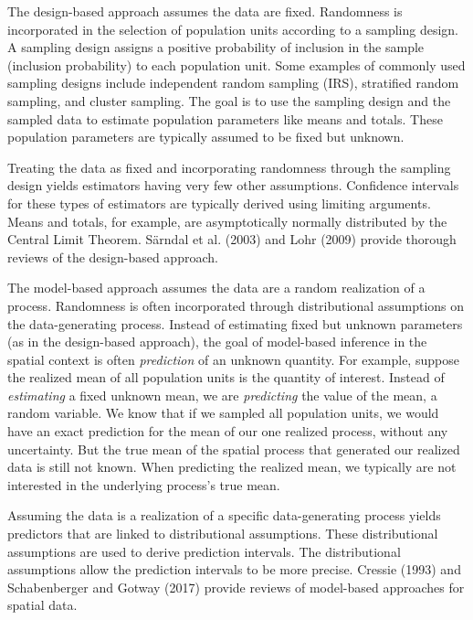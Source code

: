 \documentclass[]{elsarticle} %
\begin{document}
The design-based approach assumes the data are fixed. Randomness is
incorporated in the selection of population units according to a
sampling design. A sampling design assigns a positive probability of
inclusion in the sample (inclusion probability) to each population unit.
Some examples of commonly used sampling designs include independent
random sampling (IRS), stratified random sampling, and cluster sampling.
The goal is to use the sampling design and the sampled data to estimate
population parameters like means and totals. These population parameters
are typically assumed to be fixed but unknown.

Treating the data as fixed and incorporating randomness through the
sampling design yields estimators having very few other assumptions.
Confidence intervals for these types of estimators are typically derived
using limiting arguments. Means and totals, for example, are
asymptotically normally distributed by the Central Limit Theorem.
Särndal et al. (2003) and Lohr (2009) provide thorough reviews of the
design-based approach.

The model-based approach assumes the data are a random realization of a
process. Randomness is often incorporated through distributional
assumptions on the data-generating process. Instead of estimating fixed
but unknown parameters (as in the design-based approach), the goal of
model-based inference in the spatial context is often \emph{prediction}
of an unknown quantity. For example, suppose the realized mean of all
population units is the quantity of interest. Instead of
\emph{estimating} a fixed unknown mean, we are \emph{predicting} the
value of the mean, a random variable. We know that if we sampled all
population units, we would have an exact prediction for the mean of our
one realized process, without any uncertainty. But the true mean of the
spatial process that generated our realized data is still not known.
When predicting the realized mean, we typically are not interested in
the underlying process's true mean.

Assuming the data is a realization of a specific data-generating process
yields predictors that are linked to distributional assumptions. These
distributional assumptions are used to derive prediction intervals. The
distributional assumptions allow the prediction intervals to be more
precise. Cressie (1993) and Schabenberger and Gotway (2017) provide
reviews of model-based approaches for spatial data.
\end{document}
